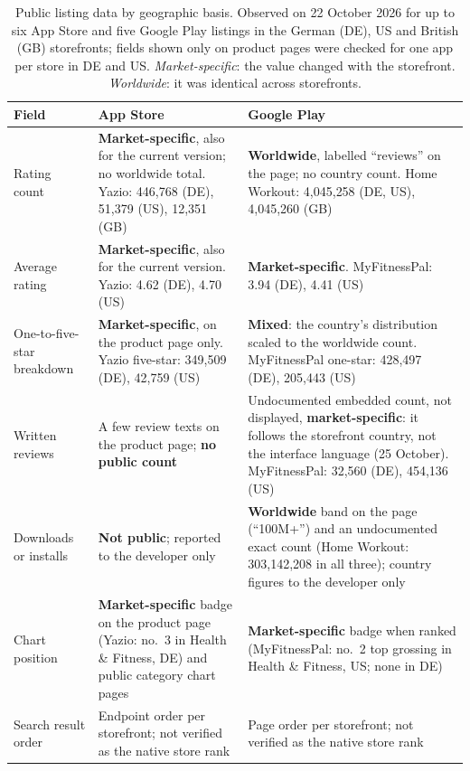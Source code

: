 \begin{table}[t]
\centering
\begin{singlespace}
\caption[Public listing data by geographic basis]{Public listing data by geographic basis. Observed on 22 October 2026
for up to six App Store and five Google Play listings in the German (DE), US
and British (GB) storefronts; fields shown only on product pages were checked
for one app per store in DE and US\@. \emph{Market-specific}: the value changed
with the storefront. \emph{Worldwide}: it was identical across storefronts.
}
\label{tab:storefront-fields}
\small
\setlength{\aboverulesep}{0.25ex}\setlength{\belowrulesep}{0.35ex}
\begin{tabularx}{\textwidth}{@{}>{\raggedright\arraybackslash}p{2.3cm}>{\raggedright\arraybackslash}X>{\raggedright\arraybackslash}X@{}}
\toprule
\textbf{Field} & \textbf{App Store} & \textbf{Google Play} \\
\midrule
Rating count & \textbf{Market-specific}, also for the current version; no
  worldwide total. Yazio: 446{,}768 (DE), 51{,}379 (US), 12{,}351 (GB)
  & \textbf{Worldwide}, labelled \enquote{reviews} on the page; no country
  count. Home Workout: 4{,}045{,}258 (DE, US), 4{,}045{,}260 (GB) \\
\midrule
Average rating & \textbf{Market-specific}, also for the current version.
  Yazio: 4.62 (DE), 4.70 (US)
  & \textbf{Market-specific}. MyFitnessPal: 3.94 (DE), 4.41 (US) \\
\midrule
One-to-five-star breakdown & \textbf{Market-specific}, on the product page
  only. Yazio five-star: 349{,}509 (DE), 42{,}759 (US)
  & \textbf{Mixed}: the country's distribution scaled to the worldwide count.
  MyFitnessPal one-star: 428{,}497 (DE), 205{,}443 (US) \\
\midrule
Written reviews & A few review texts on the product page; \textbf{no public
  count}
  & Undocumented embedded count, not displayed, \textbf{market-specific}: it
  follows the storefront country, not the interface language (25 October).
  MyFitnessPal: 32{,}560 (DE), 454{,}136 (US) \\
\midrule
Downloads or installs & \textbf{Not public}; reported to the developer
  only~\parencite{apple2026acquisition}
  & \textbf{Worldwide} band on the page (\enquote{100M+}) and an
  undocumented exact count (Home Workout: 303{,}142{,}208 in all three);
  country figures to the developer only~\parencite{google2026playstatistics} \\
\midrule
Chart position & \textbf{Market-specific} badge on the product page (Yazio:
  no.~3 in Health \& Fitness, DE) and public category chart pages
  & \textbf{Market-specific} badge when ranked (MyFitnessPal: no.~2 top
  grossing in Health \& Fitness, US; none in DE) \\
\midrule
Search result order & Endpoint order per storefront; not verified as the
  native store rank
  & Page order per storefront; not verified as the native store rank \\
\bottomrule
\end{tabularx}
\end{singlespace}
\end{table}


